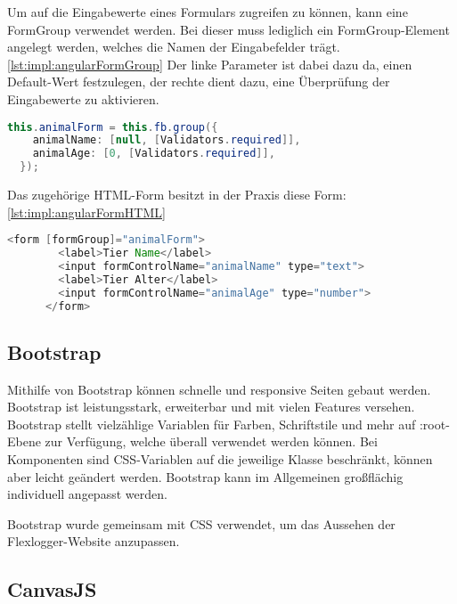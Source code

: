 Um auf die Eingabewerte eines Formulars zugreifen zu können, kann eine FormGroup verwendet werden. Bei dieser muss lediglich ein FormGroup-Element angelegt werden, welches die Namen der Eingabefelder trägt. \ref{lst:impl:angularFormGroup} Der linke Parameter ist dabei dazu da, einen Default-Wert festzulegen, der rechte dient dazu, eine Überprüfung der Eingabewerte zu aktivieren.
 
\begin{lstlisting}[language=java,caption=Beispiel für FormGroup eines Angular Formulars,label=lst:impl:angularFormGroup]
  this.animalForm = this.fb.group({
    animalName: [null, [Validators.required]],
    animalAge: [0, [Validators.required]],
  });
\end{lstlisting}

\newpage
 
Das zugehörige HTML-Form besitzt in der Praxis diese Form:  \ref{lst:impl:angularFormHTML}
 
 
\begin{lstlisting}[language=java,caption=Beispiel für ein reaktives Formular,label=lst:impl:angularFormHTML]
  <form [formGroup]="animalForm">
        <label>Tier Name</label>
        <input formControlName="animalName" type="text">
        <label>Tier Alter</label>
        <input formControlName="animalAge" type="number">
      </form>
\end{lstlisting}
\cite{angularHandbuchBuch}
 
 
\subsection{Bootstrap}
Mithilfe von Bootstrap können schnelle und responsive Seiten gebaut werden. Bootstrap ist leistungsstark, erweiterbar und mit vielen Features versehen. Bootstrap stellt vielzählige Variablen für Farben, Schriftstile und mehr auf :root-Ebene zur Verfügung, welche überall verwendet werden können. Bei Komponenten sind CSS-Variablen auf die jeweilige Klasse beschränkt, können aber leicht geändert werden. Bootstrap kann im Allgemeinen großflächig individuell angepasst werden.
\cite{bootstrap}

Bootstrap wurde gemeinsam mit CSS verwendet, um das Aussehen der Flexlogger-Website anzupassen.


\subsection{CanvasJS}
\label{subsection:canvasJS}
 
